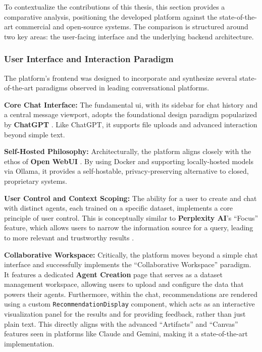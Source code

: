 To contextualize the contributions of this thesis, this section provides a comparative analysis, positioning the developed platform against the state-of-the-art commercial and open-source systems. The comparison is structured around two key areas: the user-facing interface and the underlying backend architecture.

\subsubsection{User Interface and Interaction Paradigm}

The platform's frontend was designed to incorporate and synthesize several state-of-the-art paradigms observed in leading conversational platforms.

\begin{compactitem}[\textbullet]
    \item \textbf{Core Chat Interface:} The fundamental \acs{ui}, with its sidebar for chat history and a central message viewport, adopts the foundational design paradigm popularized by \textbf{ChatGPT} \cite{CHATGPT}. Like ChatGPT, it supports file uploads and advanced interaction beyond simple text.
    
    \item \textbf{Self-Hosted Philosophy:} Architecturally, the platform aligns closely with the ethos of \textbf{Open WebUI} \cite{OPENWEBUI}. By using Docker and supporting locally-hosted models via Ollama, it provides a self-hostable, privacy-preserving alternative to closed, proprietary systems.

    \item \textbf{User Control and Context Scoping:} The ability for a user to create and chat with distinct agents, each trained on a specific dataset, implements a core principle of user control. This is conceptually similar to \textbf{Perplexity AI}'s ``Focus'' feature, which allows users to narrow the information source for a query, leading to more relevant and trustworthy results \cite{PERPLEXITY}.

    \item \textbf{Collaborative Workspace:} Critically, the platform moves beyond a simple chat interface and successfully implements the ``Collaborative Workspace'' paradigm. It features a dedicated \textbf{Agent Creation} page that serves as a dataset management workspace, allowing users to upload and configure the data that powers their agents. Furthermore, within the chat, recommendations are rendered using a custom \texttt{RecommendationDisplay} component, which acts as an interactive visualization panel for the results and for providing feedback, rather than just plain text. This directly aligns with the advanced ``Artifacts'' and ``Canvas'' features seen in platforms like Claude and Gemini, making it a state-of-the-art implementation.
\end{compactitem}

